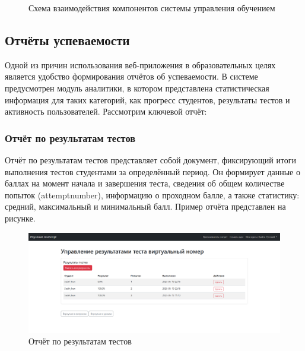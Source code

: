 \begin{figure}[ht]
	\centering
	\caption{Схема взаимодействия компонентов системы управления обучением}
	\label{system:image}
\end{figure}


\subsection{Отчёты успеваемости}
Одной из причин использования веб-приложения в образовательных целях является удобство формирования отчётов об успеваемости. В системе предусмотрен модуль аналитики, в котором представлена статистическая информация для таких категорий, как прогресс студентов, результаты тестов и активность пользователей. Рассмотрим ключевой отчёт:

\subsubsection{Отчёт по результатам тестов}
Отчёт по результатам тестов представляет собой документ, фиксирующий итоги выполнения тестов студентами за определённый период. Он формирует данные о баллах на момент начала и завершения теста, сведения об общем количестве попыток (attemptnumber), информацию о проходном балле, а также статистику: средний, максимальный и минимальный балл. Пример отчёта представлен на рисунке. 

\begin{figure}[ht]
	\centering
	\includegraphics[width=0.9\linewidth]{images/резы} 
	\caption{Отчёт по результатам тестов}
	\label{zotchet:image}
\end{figure}

